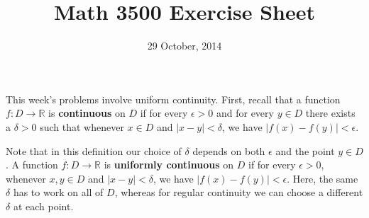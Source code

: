 \documentclass[letterpaper,12pt]{article}
\title{Math 3500 Exercise Sheet}
\date{29 October, 2014}
\newcommand{\R}{\mathbb{R}}
\newcommand{\abs}[1]{\lvert #1\rvert}
\begin{document}
\maketitle

This week's problems involve uniform continuity. First, recall that a function $f:D\to \R$ is {\bf continuous} on $D$ if for every $\epsilon>0$ and for every $y\in D$ there exists a $\delta>0$ such that whenever $x\in D$ and $\abs{x-y}<\delta$, we have $\abs{f(x)-f(y)}<\epsilon$.

Note that in this definition our choice of $\delta$ depends on both $\epsilon$ and the point $y\in D$. A function $f:D\to\R$ is {\bf uniformly continuous} on $D$ if for every $\epsilon>0$, whenever $x,y\in D$ and $\abs{x-y}<\delta$, we have $\abs{f(x)-f(y)}<\epsilon$. Here, the same $\delta$ has to work on all of $D$, whereas for regular continuity we can choose a different $\delta$ at each point.
\end{document}
